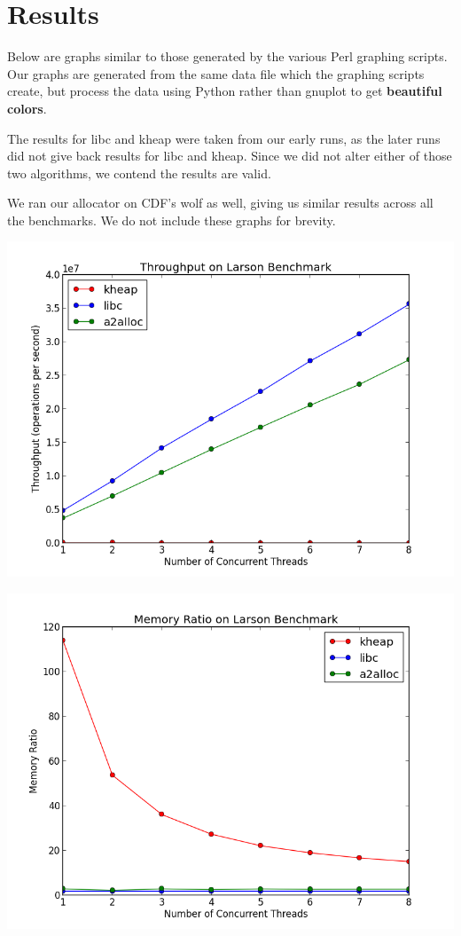 \documentclass[a4paper, 12pt]{article}
\begin{document}
\section{Results}

Below are graphs similar to those generated by the various Perl graphing scripts. Our graphs are generated from the same data file which the graphing scripts create, but process the data using Python rather than gnuplot to get \textbf{beautiful colors}.

The results for libc and kheap were taken from our early runs, as the later runs did not give back results for libc and kheap. Since we did not alter either of those two algorithms, we contend the results are valid.

We ran our allocator on CDF's wolf as well, giving us similar results across all the benchmarks. We do not include these graphs for brevity.

\vfill
\begin{center}
	\includegraphics[width=6.0 in]{larson_throughput.png}
\end{center}
\vfill

\vfill
\begin{center}
	\includegraphics[width=6.0 in]{larson_memory.png}
\end{center}
\vfill
\end{document}
